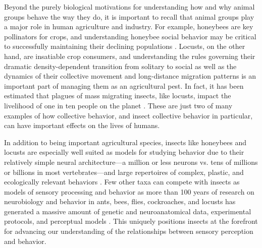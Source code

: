 \documentclass[11pt,a4paper,oneside]{article}
\begin{document}
	Beyond the purely biological motivations for understanding how and why animal groups behave the way they do, it is important to recall that animal groups play a major role in human agriculture and industry. For example, honeybees are key pollinators for crops, and understanding honeybee social behavior may be critical to successfully maintaining their declining populations \citep{vanbergen2013threats}. Locusts, on the other hand, are insatiable crop consumers, and understanding the rules governing their dramatic density-dependent transition from solitary to social  \citep{simpson2001gregarious} as well as the dynamics of their collective movement \citep{buhl2006disorder} and long-distance migration patterns \citep{kennedy1951migration} is an important part of managing them as an agricultural pest. In fact, it has been estimated that plagues of mass migrating insects, like locusts, impact the livelihood of one in ten people on the planet \citep{kennedy1985migration}. These are just two of many examples of how collective behavior, and insect collective behavior in particular, can have important effects on the lives of humans. 
	\par
	In addition to being important agricultural species, insects like honeybees and locusts are especially well suited as models for studying behavior due to their relatively simple neural architecture---a million or less neurons vs. tens of millions or billions in most vertebrates---and large repertoires of complex, plastic, and ecologically relevant behaviors \citep{haberkern2016studying}. Few other taxa can compete with insects as models of sensory processing and behavior as more than 100 years of research on neurobiology and behavior in ants, bees, flies, cockroaches, and locusts has generated a massive amount of genetic and neuroanatomical data, experimental protocols, and perceptual models \citep{menzel1983neurobiology,burrows1996neurobiology,feany2000drosophila,chittka2006recognition,north2007invertebrate,leonard2014multisensory,haberkern2016studying}. This uniquely positions insects at the forefront for advancing our understanding of the relationships between sensory perception and behavior.
	\par
\end{document}
